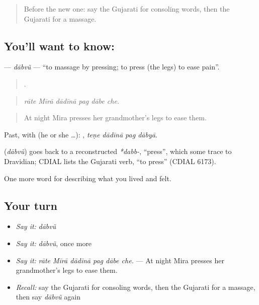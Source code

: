 \label{lesson:GU-C487-dabvu}



\begin{quote}
Before the new one: say the Gujarati for consoling words, then the Gujarati for a massage.
\end{quote}

\subsection*{You'll want to know: }
\textbf{} — \emph{dābvũ} — \textquotedblleft{}to massage by pressing; to press (the legs) to ease pain\textquotedblright{}.

\begin{quote}
     .
\end{quote}

\begin{quote}
\emph{rāte Mīrā dādīnā pag dābe che.}
\end{quote}

\begin{quote}
At night Mira presses her grandmother's legs to ease them.
\end{quote}

Past, with  (he or she …):    , \emph{teṇe dādīnā pag dābyā}.

\begin{cousinweb}
\textbf{} (\emph{dābvũ}) goes back to a reconstructed \emph{*dabb-}, \textquotedblleft{}press\textquotedblright{}, which some trace to Dravidian; CDIAL lists the Gujarati verb, \textquotedblleft{}to press\textquotedblright{} (CDIAL 6173).
\end{cousinweb}

\begin{grammarlens}[title={What you've built}]
One more word for describing what you lived and felt.
\end{grammarlens}

\subsection*{Your turn}
\begin{itemize}
\raggedright
  \item \emph{Say it:} \emph{dābvũ}
  \item \emph{Say it:} \emph{dābvũ}, once more
  \item \emph{Say it:} \emph{rāte Mīrā dādīnā pag dābe che.} — At night Mira presses her grandmother's legs to ease them.
  \item \emph{Recall:} say the Gujarati for consoling words, then the Gujarati for a massage, then say \emph{dābvũ} again
\end{itemize}

